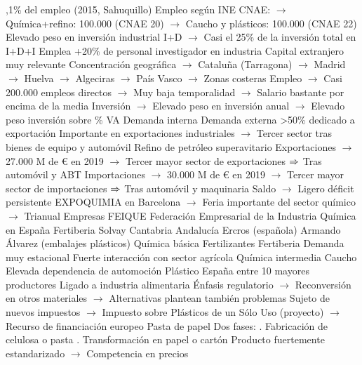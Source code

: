 \documentclass{nuevotema}
\begin{document}
\begin{esquemal}
				,1\% del empleo (2015, Sahuquillo)
				\4[] Empleo según INE CNAE:
				\4[] $\to$ Química+refino: 100.000 (CNAE 20)
				\4[] $\to$ Caucho y plásticos: 100.000 (CNAE 22)
				\4[] Elevado peso en inversión industrial I+D
				\4[] $\to$ Casi el 25\% de la inversión total en I+D+I
				\4[] Emplea +20\% de personal investigador en industria
				\4[] Capital extranjero muy relevante
				\4[] Concentración geográfica
				\4[] $\to$ Cataluña (Tarragona)
				\4[] $\to$ Madrid
				\4[] $\to$ Huelva
				\4[] $\to$ Algeciras
				\4[] $\to$ País Vasco
				\4[] $\to$ Zonas costeras
				\4[] Empleo
				\4[] $\to$ Casi 200.000 empleos directos
				\4[] $\to$ Muy baja temporalidad
				\4[] $\to$ Salario bastante por encima de la media
				\4[] Inversión
				\4[] $\to$ Elevado peso en inversión anual
				\4[] $\to$ Elevado peso inversión sobre \% VA
				\4 Demanda interna
			\3 Demanda externa
				\4 >50\% dedicado a exportación
				\4 Importante en exportaciones industriales
				\4[] $\to$ Tercer sector tras bienes de equipo y automóvil
				\4[] Refino de petróleo superavitario
				\4 Exportaciones
				\4[] $\to$ 27.000 M de € en 2019
				\4[] $\to$ Tercer mayor sector de exportaciones
				\4[] $\Rightarrow$ Tras automóvil y ABT
				\4 Importaciones
				\4[] $\to$ 30.000 M de € en 2019
				\4[] $\to$ Tercer mayor sector de importaciones
				\4[] $\Rightarrow$ Tras automóvil y maquinaria
				\4 Saldo
				\4[] $\to$ Ligero déficit persistente
				\4 EXPOQUIMIA en Barcelona
				\4[] $\to$ Feria importante del sector químico
				\4[] $\to$ Trianual
			\3 Empresas
				\4 FEIQUE
				\4[] Federación Empresarial de la Industria Química en España
				\4 Fertiberia
				\4 Solvay
				\4[] Cantabria
				\4[] Andalucía
				\4 Ercros (española)
				\4 Armando Álvarez (embalajes plásticos)
			\3 Química básica
				\4 Fertilizantes
				\4 Fertiberia
				\4 Demanda muy estacional
				\4 Fuerte interacción con sector agrícola
			\3 Química intermedia
				\4 Caucho
				\4[] Elevada dependencia de automoción
				\4 Plástico
				\4[] España entre 10 mayores productores
				\4[] Ligado a industria alimentaria
				\4[] Énfasis regulatorio
				\4[] $\to$ Reconversión en otros materiales
				\4[] $\to$ Alternativas plantean también problemas
				\4[] Sujeto de nuevos impuestos
				\4[] $\to$ Impuesto sobre Plásticos de un Sólo Uso (proyecto)
				\4[] $\to$ Recurso de financiación europeo
				\4 Pasta de papel
				\4[] Dos fases:
				. Fabricación de celulosa o pasta
				. Transformación en papel o cartón
				\4[] Producto fuertemente estandarizado
				\4[] $\to$ Competencia en precios

\end{esquemal}
\end{document}

